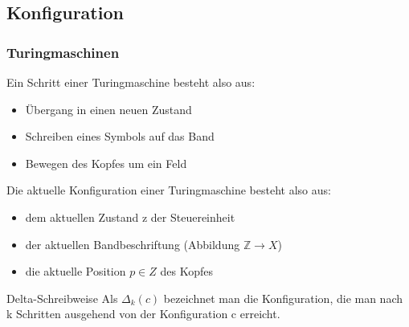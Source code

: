 \subsection{Konfiguration}
\begin{frame}[fragile]
	\frametitle{Turingmaschinen}
	Ein Schritt einer Turingmaschine besteht also aus:
	\begin{itemize}
		\item Übergang in einen neuen Zustand
		\item Schreiben eines Symbols auf das Band
		\item Bewegen des Kopfes um ein Feld
	\end{itemize}
	\pause
	Die aktuelle Konfiguration einer Turingmaschine besteht also aus:
	\begin{itemize}
		\item dem aktuellen Zustand z der Steuereinheit
		\item der aktuellen Bandbeschriftung (Abbildung $\mathbb{Z}\to X$)
		\item die aktuelle Position $p\in Z$ des Kopfes
	\end{itemize}
	\pause
	\begin{block}{Delta-Schreibweise}
		Als $\Delta_k(c)$ bezeichnet man die Konfiguration, die man nach k Schritten ausgehend von der Konfiguration c erreicht.
	\end{block}
\end{frame}

